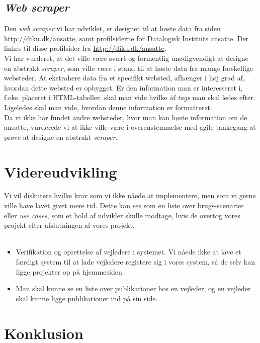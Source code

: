 \documentclass[12pt]{article}
\begin{document}
\subsection{\textit{Web scraper}}
Den \textit{web scraper} vi har udviklet, er designet til at høste data fra siden \url{http://diku.dk/ansatte}, samt profilsiderne for Datalogisk Instituts ansatte. Der linkes til disse profilsider fra \url{http://diku.dk/ansatte}.\\
Vi har vurderet, at det ville være svært og formentlig unødigvendigt at designe en abstrakt \textit{scraper}, som ville være i stand til at høste data fra mange forskellige websteder. At ekstrahere data fra et specifikt websted, afhænger i høj grad af, hvordan dette websted er opbygget. Er den information man er interesseret i, f.eks. placeret i  HTML-tabeller, skal man vide hvilke \textit{id tags} man skal ledes efter. Ligeledes skal man vide, hvordan denne information er formatteret. \\
Da vi ikke har fundet andre websteder, hvor man kan høste information om de ansatte, vurderede vi at ikke ville være i overenstemmelse med agile tankegang at prøve at designe en abstrakt \textit{scraper}.

\section{Videreudvikling}
\label{sec:udvikling}
Vi vil diskutere hvilke krav som vi ikke nåede at implementere, men som vi gerne ville have lavet givet mere tid. Dette kan ses som en liste over brugs-scenarier eller \textit{use cases}, som et hold af udvikler skulle modtage, hvis de overtog vores projekt efter afslutningen af vores projekt. \\ \\
\begin{itemize}
\item Verifikation og oprettelse af vejledere i systemet. Vi nåede ikke at lave et færdigt system til at lade vejledere registere sig i vores system, så de selv kan ligge projekter op på hjemmesiden.
\item Man skal kunne se en liste over publikationer hos en vejleder, og en vejleder skal kunne ligge publikationer ind på sin side.
\end{itemize}

\section{Konklusion}
\label{sec:konklusion}
\end{document}

